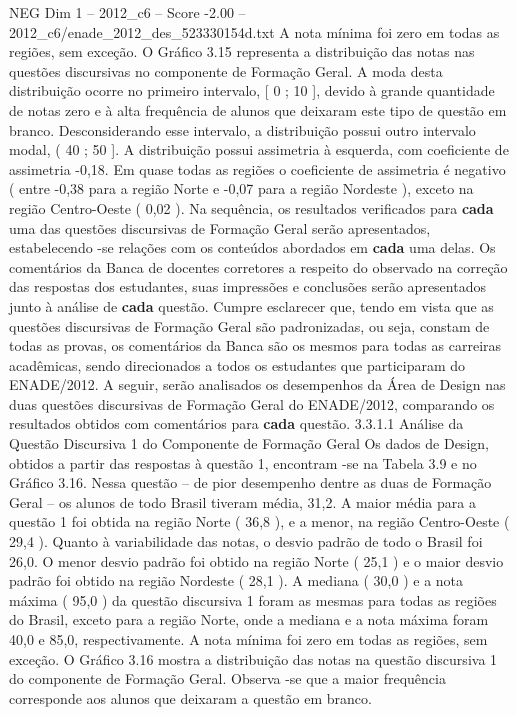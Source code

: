 \begin{textsample}{NEG Dim 1 – 2012\_c6 – Score -2.00 – 2012\_c6/enade\_2012\_des\_523330154d.txt}
A nota mínima foi zero em todas as regiões, sem exceção.
O Gráfico 3.15 representa a distribuição das notas nas questões discursivas no componente de Formação Geral.
A moda desta distribuição ocorre no primeiro intervalo, [ 0 ; 10 ], devido à grande quantidade de notas zero e à alta frequência de alunos que deixaram este tipo de questão em branco.
Desconsiderando esse intervalo, a distribuição possui outro intervalo modal, ( 40 ; 50 ].
A distribuição possui assimetria à esquerda, com coeficiente de assimetria -0,18.
Em quase todas as regiões o coeficiente de assimetria é negativo ( entre -0,38 para a região Norte e -0,07 para a região Nordeste ), exceto na região Centro-Oeste ( 0,02 ).
Na sequência, os resultados verificados para \textbf{cada} uma das questões discursivas de Formação Geral serão apresentados, estabelecendo -se relações com os conteúdos abordados em \textbf{cada} uma delas.
Os comentários da Banca de docentes corretores a respeito do observado na correção das respostas dos estudantes, suas impressões e conclusões serão apresentados junto à análise de \textbf{cada} questão.
Cumpre esclarecer que, tendo em vista que as questões discursivas de Formação Geral são padronizadas, ou seja, constam de todas as provas, os comentários da Banca são os mesmos para todas as carreiras acadêmicas, sendo direcionados a todos os estudantes que participaram do ENADE/2012.
A seguir, serão analisados os desempenhos da Área de Design nas duas questões discursivas de Formação Geral do ENADE/2012, comparando os resultados obtidos com comentários para \textbf{cada} questão. 3.3.1.1 Análise da Questão Discursiva 1 do Componente de Formação Geral Os dados de Design, obtidos a partir das respostas à questão 1, encontram -se na Tabela 3.9 e no Gráfico 3.16.
Nessa questão – de pior desempenho dentre as duas de Formação Geral – os alunos de todo Brasil tiveram média, 31,2.
A maior média para a questão 1 foi obtida na região Norte ( 36,8 ), e a menor, na região Centro-Oeste ( 29,4 ).
Quanto à variabilidade das notas, o desvio padrão de todo o Brasil foi 26,0.
O menor desvio padrão foi obtido na região Norte ( 25,1 ) e o maior desvio padrão foi obtido na região Nordeste ( 28,1 ).
A mediana ( 30,0 ) e a nota máxima ( 95,0 ) da questão discursiva 1 foram as mesmas para todas as regiões do Brasil, exceto para a região Norte, onde a mediana e a nota máxima foram 40,0 e 85,0, respectivamente.
A nota mínima foi zero em todas as regiões, sem exceção.
O Gráfico 3.16 mostra a distribuição das notas na questão discursiva 1 do componente de Formação Geral.
Observa -se que a maior frequência corresponde aos alunos que deixaram a questão em branco.

\end{textsample}
